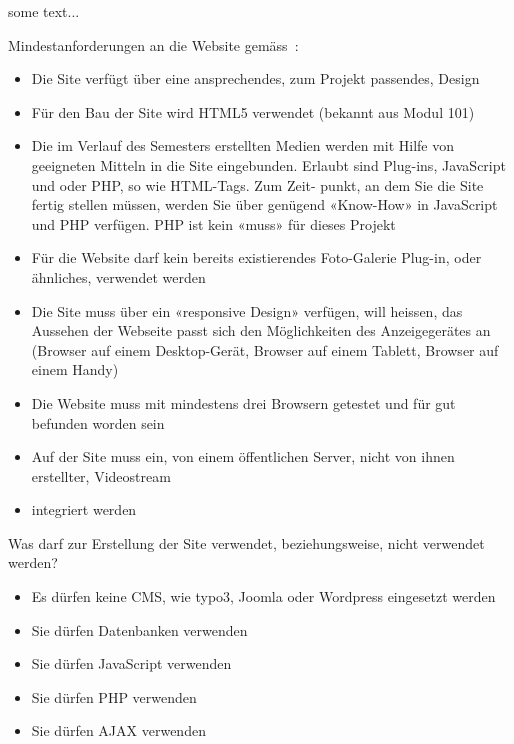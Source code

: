 
\label{einleitung}
\setcounter{page}{1}
\normalsize
some text...

Mindestanforderungen an die Website gemäss~\cite{sterchi}:
\begin{itemize}
    \item Die Site verfügt über eine ansprechendes, zum Projekt passendes, Design
    \item Für den Bau der Site wird HTML5 verwendet (bekannt aus Modul 101)
    \item Die im Verlauf des Semesters erstellten Medien werden mit Hilfe von geeigneten Mitteln in die
    Site eingebunden. Erlaubt sind Plug-ins, JavaScript und oder PHP, so wie HTML-Tags. Zum Zeit-
    punkt, an dem Sie die Site fertig stellen müssen, werden Sie über genügend «Know-How» in
    JavaScript und PHP verfügen. PHP ist kein «muss» für dieses Projekt
    \item Für die Website darf kein bereits existierendes Foto-Galerie Plug-in, oder ähnliches, verwendet werden
    \item Die Site muss über ein «responsive Design» verfügen, will heissen, das Aussehen der Webseite
    passt sich den Möglichkeiten des Anzeigegerätes an (Browser auf einem Desktop-Gerät, Browser
    auf einem Tablett, Browser auf einem Handy)
    \item Die Website muss mit mindestens drei Browsern getestet und für gut befunden worden sein
    \item Auf der Site muss ein, von einem öffentlichen Server, nicht von ihnen erstellter, Videostream
    \item integriert werden
\end{itemize}
Was darf zur Erstellung der Site verwendet, beziehungsweise, nicht verwendet werden?
\begin{itemize}
    \item Es dürfen keine CMS, wie typo3, Joomla oder Wordpress eingesetzt werden
    \item Sie dürfen Datenbanken verwenden
    \item Sie dürfen JavaScript verwenden
    \item Sie dürfen PHP verwenden
    \item Sie dürfen AJAX verwenden
\end{itemize}

